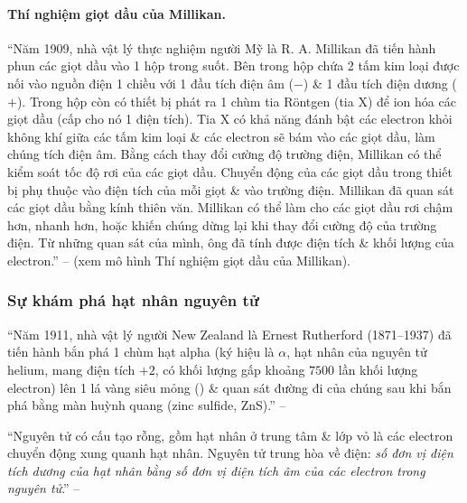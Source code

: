 \documentclass{article}
\numberwithin{equation}{section}
\begin{document}
\paragraph{Thí nghiệm giọt dầu của Millikan.} ``Năm 1909, nhà vật lý thực nghiệm người Mỹ là R. A. Millikan đã tiến hành phun các giọt dầu vào 1 hộp trong suốt. Bên trong hộp chứa 2 tấm kim loại được nối vào nguồn điện 1 chiều với 1 đầu tích điện âm ($-$) \& 1 đầu tích điện dương ($+$). Trong hộp còn có thiết bị phát ra 1 chùm tia R\"ontgen (tia X) để ion hóa các giọt dầu (cấp cho nó 1 điện tích). Tia X có khả năng đánh bật các electron khỏi không khí giữa các tấm kim loại \& các electron sẽ bám vào các giọt dầu, làm chúng tích điện âm. Bằng cách thay đổi cường độ trường điện, Millikan có thể kiểm soát tốc độ rơi của các giọt dầu. Chuyển động của các giọt dầu trong thiết bị phụ thuộc vào điện tích của mỗi giọt \& vào trường điện. Millikan đã quan sát các giọt dầu bằng kính thiên văn. Millikan có thể làm cho các giọt dầu rơi chậm hơn, nhanh hơn, hoặc khiến chúng dừng lại khi thay đổi cường độ của trường điện. Từ những quan sát của mình, ông đã tính được điện tích \& khối lượng của electron.'' -- \cite[p. 15]{SGK_Hoa_Hoc_10_Chan_Troi_Sang_Tao} (xem mô hình \textsf{Thí nghiệm giọt dầu của Millikan}).

\subsubsection{Sự khám phá hạt nhân nguyên tử}
``Năm 1911, nhà vật lý người New Zealand là Ernest Rutherford (1871--1937) đã tiến hành bắn phá 1 chùm hạt alpha (ký hiệu là $\alpha$, hạt nhân của nguyên tử helium, mang điện tích $+2$, có khối lượng gấp khoảng $7500$ lần khối lượng electron) lên 1 lá vàng siêu mỏng (\cite[Hình 2.3: \textsf{Thí nghiệm khám phá hạt nhân nguyên tử của Rutherford}, p. 16]{SGK_Hoa_Hoc_10_Chan_Troi_Sang_Tao}) \& quan sát đường đi của chúng sau khi bắn phá bằng màn huỳnh quang (zinc sulfide, ZnS).'' -- \cite[p. 15]{SGK_Hoa_Hoc_10_Chan_Troi_Sang_Tao}

``Nguyên tử có cấu tạo rỗng, gồm hạt nhân ở trung tâm \& lớp vỏ là các electron chuyển động xung quanh hạt nhân. Nguyên tử trung hòa về điện: \textit{số đơn vị điện tích dương của hạt nhân bằng số đơn vị điện tích âm của các electron trong nguyên tử}.'' -- \cite[p. 16]{SGK_Hoa_Hoc_10_Chan_Troi_Sang_Tao}
\end{document}
